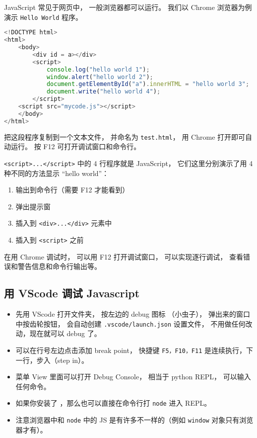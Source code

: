 
JavaScript 常见于网页中， 一般浏览器都可以运行。 我们以 Chrome 浏览器为例演示 \verb|Hello World| 程序。

\begin{lstlisting}[language=js]
<!DOCTYPE html>
<html>
	<body>
		<div id = a></div>
		<script>
            console.log("hello world 1");
            window.alert("hello world 2");
			document.getElementById("a").innerHTML = "hello world 3";
            document.write("hello world 4");
		</script>
    <script src="mycode.js"></script>
	</body>
</html>
\end{lstlisting}
把这段程序复制到一个文本文件， 并命名为 \verb|test.html|， 用 Chrome 打开即可自动运行。 按 F12 可打开调试窗口和命令行。

\verb|<script>...</script>| 中的 4 行程序就是 JavaScript， 它们这里分别演示了用 4 种不同的方法显示 “hello world”：
\begin{enumerate}
\item 输出到命令行（需要 F12 才能看到）
\item 弹出提示窗
\item 插入到 \verb|<div>...</div>| 元素中
\item 插入到 \verb|<script>| 之前
\end{enumerate}

在用 Chrome 调试时， 可以用 F12 打开调试窗口， 可以实现逐行调试， 查看错误和警告信息和命令行输出等。

\subsection{用 VScode 调试 Javascript}
\begin{itemize}
\item 先用 VScode 打开文件夹， 按左边的 debug 图标 （小虫子）， 弹出来的窗口中按齿轮按钮， 会自动创建 \verb`.vscode/launch.json` 设置文件， 不用做任何改动，现在就可以 debug 了。
\item 可以在行号左边点击添加 break point， 快捷键 \verb`F5，F10，F11` 是连续执行，下一行，步入（step in）。
\item 菜单 View 里面可以打开 Debug Console， 相当于 python REPL， 可以输入任何命令。
\item 如果你安装了 ，那么也可以直接在命令行打 \verb`node` 进入 REPL。
\item 注意浏览器中和 \verb`node` 中的 JS 是有许多不一样的（例如 \verb`window` 对象只有浏览器才有）。
\end{itemize}


